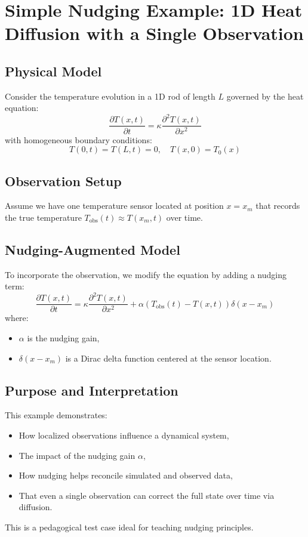 
\section{Simple Nudging Example: 1D Heat Diffusion with a Single Observation}

\subsection*{Physical Model}

Consider the temperature evolution in a 1D rod of length $L$ governed by the heat equation:
\[
\frac{\partial T(x,t)}{\partial t} = \kappa \frac{\partial^2 T(x,t)}{\partial x^2}
\]
with homogeneous boundary conditions:
\[
T(0,t) = T(L,t) = 0, \quad T(x,0) = T_0(x)
\]

\subsection*{Observation Setup}

Assume we have one temperature sensor located at position $x = x_m$ that records the true temperature $T_{\text{obs}}(t) \approx T(x_m,t)$ over time.

\subsection*{Nudging-Augmented Model}

To incorporate the observation, we modify the equation by adding a nudging term:
\[
\frac{\partial T(x,t)}{\partial t} = \kappa \frac{\partial^2 T(x,t)}{\partial x^2} + \alpha (T_{\text{obs}}(t) - T(x,t)) \delta(x - x_m)
\]
where:
\begin{itemize}
  \item $\alpha$ is the nudging gain,
  \item $\delta(x - x_m)$ is a Dirac delta function centered at the sensor location.
\end{itemize}

\subsection*{Purpose and Interpretation}

This example demonstrates:
\begin{itemize}
  \item How localized observations influence a dynamical system,
  \item The impact of the nudging gain $\alpha$,
  \item How nudging helps reconcile simulated and observed data,
  \item That even a single observation can correct the full state over time via diffusion.
\end{itemize}

This is a pedagogical test case ideal for teaching nudging principles.

